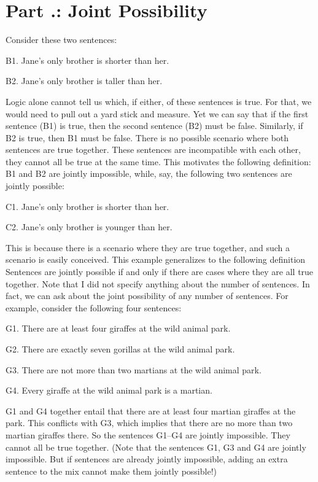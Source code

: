 \section{Part \thechapcount.\theseccount: Joint Possibility}\label{s.joint}
Consider these two sentences:
\begin{ebullet}
\item[B1.] Jane’s only brother is shorter than her.
\item[B2.] Jane’s only brother is taller than her.
\end{ebullet}
Logic alone cannot tell us which, if either, of these sentences is true. For that, we would need to pull out a yard stick and measure. Yet we can say that if the first sentence (B1) is true, then the second sentence (B2) must be false. Similarly, if B2 is true, then B1 must be false. There is no possible scenario where both sentences are true together. These sentences are incompatible with each other, they cannot all be true at the same time. This motivates the following definition:
B1 and B2 are jointly impossible, while, say, the following two sentences are jointly possible:
\begin{ebullet}
\item[C1.] Jane’s only brother is shorter than her.
\item[C2.] Jane’s only brother is younger than her.
\end{ebullet}
This is because there is a scenario where they are true together, and such a scenario is easily conceived. This example generalizes to the following definition
Sentences are jointly possible if and only if there are cases where they are all true together.
Note that I did not specify anything about the number of sentences. In fact, we can ask about the joint possibility of any number of sentences. For example, consider the following four sentences:
\begin{ebullet}
\item[G1.] There are at least four giraffes at the wild animal park.
\item[G2.] There are exactly seven gorillas at the wild animal park.
\item[G3.] There are not more than two martians at the wild animal park.
\item[G4.] Every giraffe at the wild animal park is a martian.
\end{ebullet}
G1 and G4 together entail that there are at least four martian giraffes at the park. This conflicts with G3, which implies that there are no more than two martian giraffes there. So the sentences G1–G4 are jointly impossible. They cannot all be true together. (Note that the sentences G1, G3 and G4 are jointly impossible. But if sentences are already jointly impossible, adding an extra sentence to the mix cannot make them jointly possible!)

